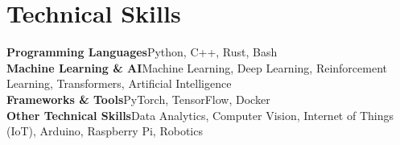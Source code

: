 \documentclass[letterpaper,11pt]{article}
\begin{document}
\section{Technical Skills}
 \begin{itemize}[leftmargin=0.15in, label={}]
    \small{\item{
     \textbf{Programming Languages}{Python, C++, Rust, Bash} \\
     \textbf{Machine Learning & AI}{Machine Learning, Deep Learning, Reinforcement Learning, Transformers, Artificial Intelligence} \\
     \textbf{Frameworks & Tools}{PyTorch, TensorFlow, Docker} \\
     \textbf{Other Technical Skills}{Data Analytics, Computer Vision, Internet of Things (IoT), Arduino, Raspberry Pi, Robotics} \\
    }}
 \end{itemize}
 \vspace{-16pt}
\end{document}

